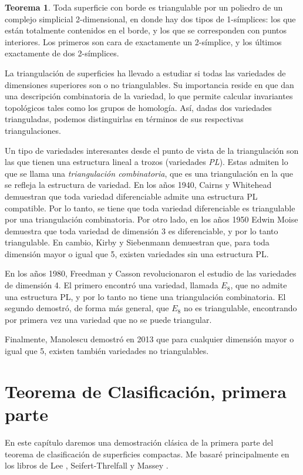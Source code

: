 \documentclass[10pt]{report}
\theoremstyle{definition}
\newtheorem{tma}[defin]{Teorema}
\begin{document}
\begin{tma}
Toda superficie con borde es triangulable por un poliedro de un complejo simplicial 2-dimensional, en donde hay dos tipos de 1-símplices: los que están totalmente contenidos en el borde, y los que se corresponden con puntos interiores. Los primeros son cara de exactamente un 2-símplice, y los últimos exactamente de dos 2-símplices.
\end{tma}

La triangulación de superficies ha llevado a estudiar si todas las variedades de dimensiones superiores son o no triangulables. Su importancia reside en que dan una descripción combinatoria de la variedad, lo que permite calcular invariantes topológicos tales como los grupos de homología. Así, dadas dos variedades trianguladas, podemos distinguirlas en términos de sus respectivas triangulaciones.

Un tipo de variedades interesantes desde el punto de vista de la triangulación son las que tienen una estructura lineal a trozos (variedades \textit{PL}). Estas admiten lo que se llama una \textit{triangulación combinatoria}, que es una triangulación en la que se refleja la estructura de variedad. En los años 1940, Cairns y Whitehead \cite{cairns} demuestran que toda variedad diferenciable admite una estructura PL compatible.
Por lo tanto, se tiene que toda variedad diferenciable es triangulable por una triangulación combinatoria.
Por otro lado, en los años 1950 Edwin Moise \cite{moise} demuestra que toda variedad de dimensión 3 es diferenciable, y por lo tanto triangulable. En cambio, Kirby y Siebenmann \cite{kirby} demuestran que, para toda dimensión mayor o igual que 5, existen variedades sin una estructura PL. 

En los años 1980, Freedman y Casson revolucionaron el estudio de las variedades de dimensión 4. El primero \cite{freedman} encontró una variedad, llamada $E_8$, que no admite una estructura PL, y por lo tanto no tiene una triangulación combinatoria. El segundo \cite{casson} demostró, de forma más general, que $E_8$ no es triangulable, encontrando por primera vez una variedad que no se puede triangular.

Finalmente, Manolescu \cite{manolescu} demostró en 2013 que para cualquier dimensión mayor o igual que 5, existen también variedades no triangulables.


\clearpage

\chapter{Teorema de Clasificación, primera parte}
En este capítulo daremos una demostración clásica de la primera parte del teorema de clasificación de superficies compactas. Me basaré principalmente en los libros de Lee \cite{lee1}, Seifert-Threlfall \cite{seifert} y Massey \cite{massey}.
\end{document}
